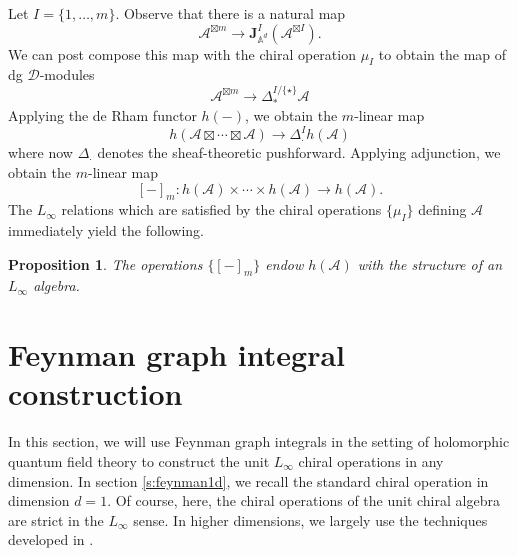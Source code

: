 \documentclass[11pt]{amsart}
\newtheorem{prop}[thm]{Proposition}
\theoremstyle{definition}
\theoremstyle{remark}
\numberwithin{equation}{section}
\begin{document}
Let $I = \{1,\ldots,m\}$.
Observe that there is a natural map 
\begin{equation}\label{}
  \mathcal{A}^{\boxtimes m} \to \mathbf{J}^I_{\mathbb{A}^d} (\mathcal{A}^{\boxtimes I}).
\end{equation}
We can post compose this map with the chiral operation $\mu_I$ to obtain the map of dg $\mathcal{D}$-modules
\begin{equation}\label{}
  \mathcal{A}^{\boxtimes m} \to \Delta_*^{I \slash \{\star\}} \mathcal{A} 
\end{equation}
Applying the de Rham functor $h(-)$, we obtain the $m$-linear map
\begin{equation}\label{}
  h(\mathcal{A} \boxtimes \cdots \boxtimes \mathcal{A}) \to \Delta_{\cdot}^I h(\mathcal{A})
\end{equation}
where now $\Delta_\cdot$ denotes the sheaf-theoretic pushforward.
Applying adjunction, we obtain the $m$-linear map
$$
[-]_m \colon h(\mathcal{A}) \times \cdots \times h(\mathcal{A})\rightarrow h(\mathcal{A}).
$$
The $L_\infty$ relations which are satisfied by the chiral operations $\{\mu_I\}$ defining $\mathcal{A}$ immediately
yield the following.

\begin{prop}\label{prop:derham}
  The operations $\{[-]_m\}$ endow $h(\mathcal{A})$ with the structure of an $L_\infty$ algebra.
\end{prop}

\section{Feynman graph integral construction}\label{s:feynman}

In this section, we will use Feynman graph integrals in the setting of holomorphic quantum field theory to construct the unit
$L_{\infty}$ chiral operations in any dimension.
In section \ref{s:feynman1d}, we recall the standard chiral operation in dimension $d=1$.
Of course, here, the chiral operations of the unit chiral algebra are strict in the $L_\infty$ sense.
In higher dimensions, we largely use the techniques developed in \cite{wang2024feynman}.
\end{document}
